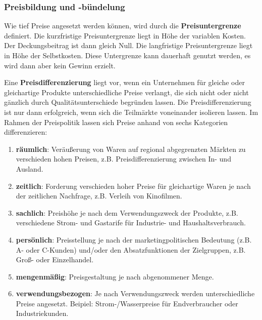 \subsubsection{Preisbildung und -bündelung}

Wie tief Preise angesetzt werden können, wird durch die {\bf Preisuntergrenze} definiert. Die kurzfristige Preisuntergrenze liegt in Höhe der variablen Kosten. Der Deckungsbeitrag ist dann gleich Null. Die langfristige Preisuntergrenze liegt in Höhe der Selbstkosten. Diese Untergrenze kann dauerhaft genutzt werden, es wird dann aber kein Gewinn erzielt.

Eine {\bf Preisdifferenzierung} liegt vor, wenn ein Unternehmen für gleiche oder gleichartige Produkte unterschiedliche Preise verlangt, die sich nicht oder nicht gänzlich durch Qualitätsunterschiede begründen lassen. Die Preisdifferenzierung ist nur dann erfolgreich, wenn sich die Teilmärkte voneinander isolieren lassen. Im Rahmen der Preispolitik lassen sich Preise anhand von sechs Kategorien differenzieren:

\begin{enumerate}
	\item {\bf räumlich}: Veräußerung von Waren auf regional abgegrenzten Märkten zu verschieden hohen Preisen, z.B. Preisdifferenzierung  zwischen In- und Ausland.
	\item {\bf zeitlich}: Forderung verschieden hoher Preise für gleichartige Waren je nach der zeitlichen Nachfrage, z.B. Verleih von Kinofilmen.
	\item {\bf sachlich}: Preishöhe je nach dem Verwendungszweck der Produkte, z.B. verschiedene Strom- und Gastarife für Industrie- und Haushaltsverbrauch.
	\item {\bf persönlich}: Preisstellung je nach der marketingpolitischen Bedeutung (z.B. A- oder C-Kunden) und/oder den Absatzfunktionen der Zielgruppen, z.B. Groß- oder Einzelhandel.
	\item {\bf mengenmäßig}: Preisgestaltung je nach abgenommener Menge.
	\item {\bf verwendungsbezogen}: Je nach Verwendungszweck werden unterschiedliche Preise angesetzt. Beipiel: Strom-/Wasserpreise für Endverbraucher oder Industriekunden.
\end{enumerate}

